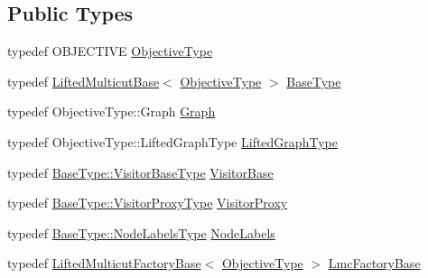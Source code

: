 \subsection*{Public Types}
\begin{DoxyCompactItemize}
\item 
typedef O\+B\+J\+E\+C\+T\+I\+V\+E \hyperlink{classnifty_1_1graph_1_1lifted__multicut_1_1LiftedMulticutMp_acce0234d990c40af0002f39dd7e309b7}{Objective\+Type}
\item 
typedef \hyperlink{classnifty_1_1graph_1_1lifted__multicut_1_1LiftedMulticutBase}{Lifted\+Multicut\+Base}$<$ \hyperlink{classnifty_1_1graph_1_1lifted__multicut_1_1LiftedMulticutMp_acce0234d990c40af0002f39dd7e309b7}{Objective\+Type} $>$ \hyperlink{classnifty_1_1graph_1_1lifted__multicut_1_1LiftedMulticutMp_a1970d0f11c6f47d763b4e102a3ea9213}{Base\+Type}
\item 
typedef Objective\+Type\+::\+Graph \hyperlink{classnifty_1_1graph_1_1lifted__multicut_1_1LiftedMulticutMp_acafc07ce6f89254b32d9ca4872d6de15}{Graph}
\item 
typedef Objective\+Type\+::\+Lifted\+Graph\+Type \hyperlink{classnifty_1_1graph_1_1lifted__multicut_1_1LiftedMulticutMp_ac0b728dbc78c20796f66b738b2b6d99f}{Lifted\+Graph\+Type}
\item 
typedef \hyperlink{classnifty_1_1graph_1_1optimization_1_1common_1_1SolverBase_a5a14d64c70a9cc0eebc7d71d2b089f9b}{Base\+Type\+::\+Visitor\+Base\+Type} \hyperlink{classnifty_1_1graph_1_1lifted__multicut_1_1LiftedMulticutMp_aafe286a57ff4bda8e0c50a00a98c3b32}{Visitor\+Base}
\item 
typedef \hyperlink{classnifty_1_1graph_1_1optimization_1_1common_1_1SolverBase_a58913ea9ab9232ff72608b710c1012d0}{Base\+Type\+::\+Visitor\+Proxy\+Type} \hyperlink{classnifty_1_1graph_1_1lifted__multicut_1_1LiftedMulticutMp_a626d90e31497d790dd454961ce179d8a}{Visitor\+Proxy}
\item 
typedef \hyperlink{classnifty_1_1graph_1_1optimization_1_1common_1_1SolverBase_a6e4e465f3b6e039882669fcfb9714818}{Base\+Type\+::\+Node\+Labels\+Type} \hyperlink{classnifty_1_1graph_1_1lifted__multicut_1_1LiftedMulticutMp_a161412253a683e250bb4c164d40a0d9e}{Node\+Labels}
\item 
typedef \hyperlink{classnifty_1_1graph_1_1lifted__multicut_1_1LiftedMulticutFactoryBase}{Lifted\+Multicut\+Factory\+Base}$<$ \hyperlink{classnifty_1_1graph_1_1lifted__multicut_1_1LiftedMulticutMp_acce0234d990c40af0002f39dd7e309b7}{Objective\+Type} $>$ \hyperlink{classnifty_1_1graph_1_1lifted__multicut_1_1LiftedMulticutMp_af71b591afe9d847b241acab738c740c4}{Lmc\+Factory\+Base}

\end{DoxyCompactItemize}
